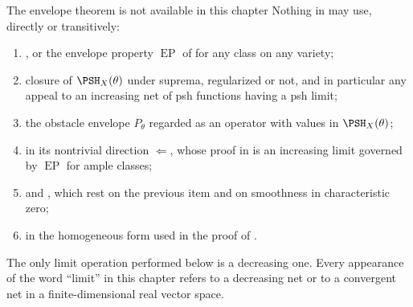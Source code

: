 \begin{warning}{The envelope theorem is not available in this chapter}
\label{warn:ch38-firewall}
Nothing in  may use, directly or
transitively:
\begin{enumerate}
\item {}, or the envelope property
 $\operatorname{EP}$ of  for any class on
 any variety;
\item closure of $\PSH_X(\theta)$ under suprema, regularized or not, and
 in particular any appeal to an increasing net of psh functions having a
 psh limit;
\item the obstacle envelope $P_\theta$ regarded as an operator with
 values in $\PSH_X(\theta)$;
\item {} in its nontrivial direction
 $\Leftarrow$, whose proof in
  is an increasing limit governed by
 $\operatorname{EP}$ for ample classes;
\item {} and
 , which rest on the previous item
 and on smoothness in characteristic zero;
\item {} in the homogeneous form used in the
 proof of .
\end{enumerate}
The only limit operation performed below is a decreasing one.  Every
appearance of the word ``limit'' in this chapter refers to a decreasing
net or to a convergent net in a finite-dimensional real vector space.
\end{warning}

